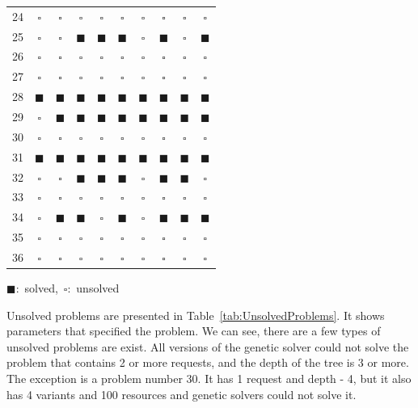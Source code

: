 \begin{table}
{\begin{minipage}[t]{0.49\linewidth}
\begin{tabular}[t]{c | c | c | c | c | c | c | c | c | c}
			24 & $\square$ & $\square$ & $\square$ & $\square$ & $\square$ & $\square$ & $\square$ & $\square$ & $\square$ \\
			25 & $\square$ & $\square$ & $\blacksquare$ & $\blacksquare$ & $\blacksquare$ & $\square$ & $\blacksquare$ & $\square$ & $\blacksquare$ \\
			26 & $\square$ & $\square$ & $\square$ & $\square$ & $\square$ & $\square$ & $\square$ & $\square$ & $\square$ \\
			27 & $\square$ & $\square$ & $\square$ & $\square$ & $\square$ & $\square$ & $\square$ & $\square$ & $\square$ \\
			28 & $\blacksquare$ & $\blacksquare$ & $\blacksquare$ & $\blacksquare$ & $\blacksquare$ & $\blacksquare$ & $\blacksquare$ & $\blacksquare$ & $\blacksquare$ \\
			29 & $\square$ & $\blacksquare$ & $\blacksquare$ & $\blacksquare$ & $\blacksquare$ & $\blacksquare$ & $\blacksquare$ & $\blacksquare$ & $\blacksquare$ \\
			30 & $\square$ & $\square$ & $\square$ & $\square$ & $\square$ & $\square$ & $\square$ & $\square$ & $\square$ \\
			31 & $\blacksquare$ & $\blacksquare$ & $\blacksquare$ & $\blacksquare$ & $\blacksquare$ & $\blacksquare$ & $\blacksquare$ & $\blacksquare$ & $\blacksquare$ \\
			32 & $\square$ & $\square$ & $\blacksquare$ & $\blacksquare$ & $\blacksquare$ & $\square$ & $\blacksquare$ & $\blacksquare$ & $\square$ \\ 
			33 & $\square$ & $\square$ & $\square$ & $\square$ & $\square$ & $\square$ & $\square$ & $\square$ & $\square$ \\
			34 & $\square$ & $\blacksquare$ & $\blacksquare$ & $\square$ & $\blacksquare$ & $\square$ & $\blacksquare$ & $\blacksquare$ & $\blacksquare$ \\
			35 & $\square$ & $\square$ & $\square$ & $\square$ & $\square$ & $\square$ & $\square$ & $\square$ & $\square$ \\
			36 & $\square$ & $\square$ & $\square$ & $\square$ & $\square$ & $\square$ & $\square$ & $\square$ & $\square$ \\
			\hline
		\end{tabular} %
	\end{minipage}
	}
	\mbox{$\blacksquare$: solved, $\square$: unsolved}
\end{table}

Unsolved problems are presented in Table~\ref{tab:UnsolvedProblems}. It shows parameters that specified the problem. We can see, there are a few types of unsolved problems are exist. All versions of the genetic solver could not solve the problem that contains 2 or more requests, and the depth of the tree is 3 or more. The exception is a problem number 30. It has 1 request and depth - 4, but it also has 4 variants and 100 resources and genetic solvers could not solve it.

